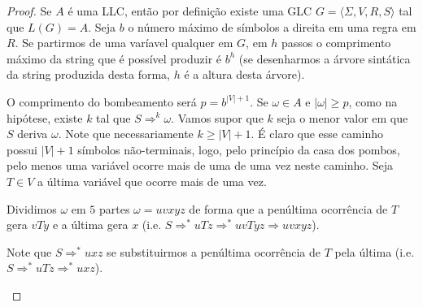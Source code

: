 \begin{proof}
  Se $A$ é uma LLC, então por definição existe uma GLC $G = \langle \Sigma, V, R, S \rangle$ tal que $L(G) = A$.
  Seja $b$ o número máximo de símbolos a direita em uma regra em $R$.
  Se partirmos de uma varíavel qualquer em $G$, em $h$ passos o comprimento máximo da string que é possível produzir é $b^h$ (se desenharmos a árvore sintática da string produzida desta forma, $h$ é a altura desta árvore).

  O comprimento do bombeamento será $p = b^{|V| + 1}$.
  Se $\omega \in A$ e $|\omega| \geq p$, como na hipótese, existe $k$ tal que $S \Rightarrow^k \omega$.
  Vamos supor que $k$ seja o menor valor em que $S$ deriva $\omega$.
  Note que necessariamente $k \geq |V| + 1$.
  É claro que esse caminho possui $|V|+1$ símbolos não-terminais, logo, pelo princípio da casa dos pombos, pelo menos uma variável ocorre mais de uma de uma vez neste caminho.
  Seja $T \in V$ a última variável que ocorre mais de uma vez.

  Dividimos $\omega$ em $5$ partes $\omega = uvxyz$ de forma que a penúltima ocorrência de $T$ gera $vTy$ e a última gera $x$ (i.e. $S \Rightarrow^* uTz \Rightarrow^* uvTyz \Rightarrow uvxyz$).


 \begin{center}
  \end{center}

Note que $S \Rightarrow^* uxz$ se substituirmos a penúltima ocorrência de $T$ pela última (i.e. $S \Rightarrow^* uTz \Rightarrow^* uxz$).

 \begin{center}
  \end{center}


\end{proof}
